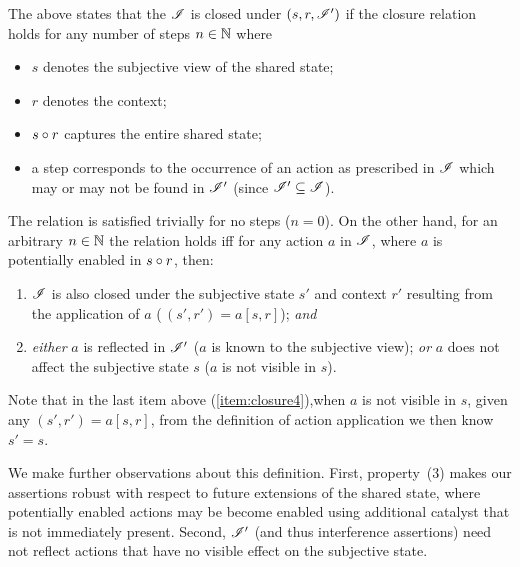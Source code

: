 The above states that the $\mathscr{I}$ is closed under $(s, r, \mathscr{I}')$ if the closure relation holds for any number of steps $n \in \mathbb{N}$ where 
\begin{itemize}
	\item $s$ denotes the subjective view of the shared state; 
	\item $r$ denotes the context; 
	\item $s \circ r$ captures the entire shared state; 
	\item a step corresponds to the occurrence of an action as prescribed in $\mathscr{I}$ which may or may not be found in $\mathscr{I}'$ (since $\mathscr{I}' \subseteq \mathscr{I}$). 
\end{itemize}   
%
The relation is satisfied trivially for no steps ($n = 0$). On the other hand, for an arbitrary $n\in \mathbb{N}$ the relation holds iff for any action $a$ in $\mathscr{I}$, where $a$ is potentially enabled in $s \circ r$, then:
%	
\begin{enumerate}\renewcommand{\theenumi}{\alph{enumi}}
	\item $\mathscr{I}$ is also closed under the subjective state $s'$ and context $r'$ resulting from the application of $a$ ($\,(s', r') = a[s, r]$); \textit{and} 
	
	\item \label{item:closure4} \emph{either} $a$ is reflected in $\mathscr{I}'$ ($a$ is known to the subjective view); \textit{or} $a$ does not affect the subjective state $s$ ($a$ is not visible in $s$). 
\end{enumerate}
%
%
Note that in the last item above (\ref{item:closure4}),when $a$ is not visible in $s$, given any $(s', r') = a[s, r]$, from the definition of action application we then know $s' = s$. 

We make further observations about this definition. First, property~(3) makes our assertions robust with respect to future extensions of the shared state, where potentially enabled actions may be become enabled using additional catalyst that is not immediately present. Second, $\mathscr{I}'$ (and thus interference assertions) need not reflect actions that have no visible effect on the subjective state.

